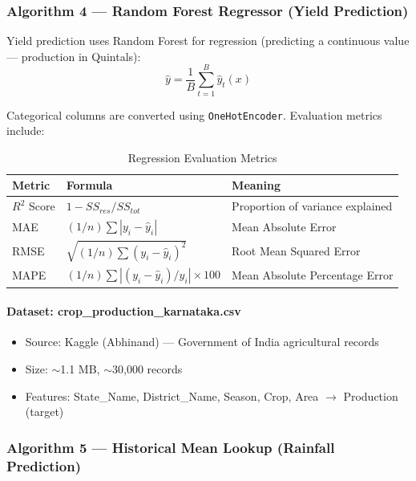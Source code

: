 \subsubsection{Algorithm 4 --- Random Forest Regressor (Yield Prediction)}

Yield prediction uses Random Forest for regression (predicting a continuous value --- production in Quintals):
\begin{equation}
\hat{y} = \frac{1}{B} \sum_{t=1}^{B} \hat{y}_t(x)
\label{eq:rf_regression}
\end{equation}

Categorical columns are converted using \texttt{OneHotEncoder}. Evaluation metrics include:

\begin{table}[ht]
\centering
\caption{Regression Evaluation Metrics}
\label{tab:reg_metrics}
\begin{tabular}{|l|p{4cm}|p{5cm}|}
\hline
\textbf{Metric} & \textbf{Formula} & \textbf{Meaning} \\
\hline
$R^2$ Score & $1 - SS_{res}/SS_{tot}$ & Proportion of variance explained \\
MAE & $(1/n)\sum|y_i - \hat{y}_i|$ & Mean Absolute Error \\
RMSE & $\sqrt{(1/n)\sum(y_i-\hat{y}_i)^2}$ & Root Mean Squared Error \\
MAPE & $(1/n)\sum|(y_i-\hat{y}_i)/y_i|\times 100$ & Mean Absolute Percentage Error \\
\hline
\end{tabular}
\end{table}

\paragraph{Dataset: crop\_production\_karnataka.csv}
\begin{itemize}
    \item Source: Kaggle (Abhinand) --- Government of India agricultural records
    \item Size: $\sim$1.1 MB, $\sim$30,000 records
    \item Features: State\_Name, District\_Name, Season, Crop, Area $\rightarrow$ Production (target)
\end{itemize}

\subsubsection{Algorithm 5 --- Historical Mean Lookup (Rainfall Prediction)}

